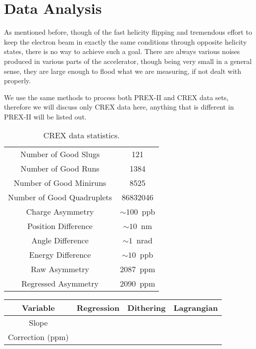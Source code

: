 \chapter{Data Analysis}
As mentioned before, though of the fast helicity flipping and tremendous effort to keep 
the electron beam in exactly the same conditions through opposite helicity states, 
there is no way to achieve such a goal. There are always various noises produced
in various parts of the accelerator, though being very small in a general sense, 
they are large enough to flood what we are measuring, if not dealt with properly.  

We use the same methods to process both PREX-II and CREX data sets, therefore we will
discuss only CREX data here, anything that is different in PREX-II will be listed
out.

\begin{table}
    \centering
    \begin{tabular}{c | c}
	\hline
	Number of Good Slugs	    & 121   \\
	Number of Good Runs	    & 1384  \\
	Number of Good Miniruns	    & 8525  \\
	Number of Good Quadruplets  & 86832046  \\
	\hline
	Charge Asymmetry    & $\sim 100$~ppb	\\
	Position Difference & $\sim 10$~nm  \\
	Angle Difference    & $\sim 1$~nrad \\
	Energy Difference   & $\sim 10$~ppb \\
	\hline	    
	Raw Asymmetry	    & $2087$~ppm    \\
	Regressed Asymmetry & $2090$~ppm    \\
	\hline
    \end{tabular}
    \caption{CREX data statistics.}
\end{table}

\begin{table}
    \centering
    \begin{tabular}{c | c c c}
	\hline
	Variable    & Regression    & Dithering	    & Lagrangian    \\
	\hline
	Slope	\\
	Correction (ppm)  \\
	\hline
    \end{tabular}
\end{table}

